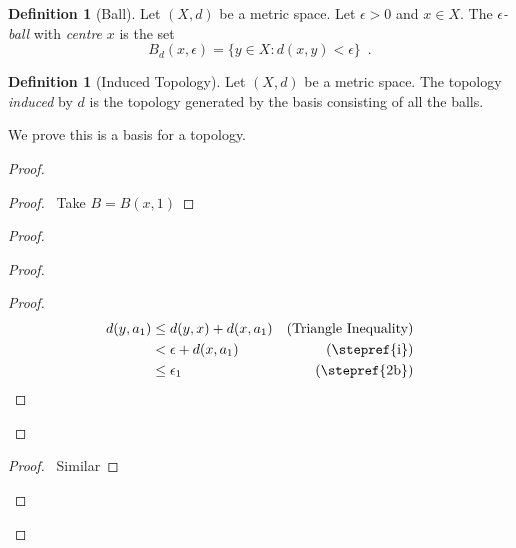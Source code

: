 \documentclass{book}
\theoremstyle{definition}
\newtheorem{df}[lm]{Definition}
\begin{document}
  \begin{df}[Ball]
    Let $(X, d)$ be a metric space. Let $\epsilon > 0$ and $x \in X$. The 
    \emph{$\epsilon$-ball} with \emph{centre} $x$ is the set
    \[ B_d(x, \epsilon) = \{ y \in X : d(x, y) < \epsilon \} \enspace . \]
  \end{df}
  
  \begin{df}[Induced Topology]
    Let $(X, d)$ be a metric space. The topology \emph{induced} by $d$ is the 
    topology generated by the basis consisting of all the balls.
    
    We prove this is a basis for a topology.
  \end{df}
  
  \begin{proof}
    \begin{proof}
      \pf\ Take $B = B(x, 1)$
    \end{proof}
    \begin{proof}
      \begin{proof}
        \begin{proof}
          \pf\ \begin{align*}
            d(y, a_1) & \leq d(y, x) + d(x, a_1) & (\text{Triangle 
              Inequality}) \\
            & < \epsilon + d(x, a_1) & (\text{\stepref{i}}) \\
            & \leq \epsilon_1 & (\text{\stepref{2b}})
          \end{align*}
        \end{proof}
      \end{proof}
      \begin{proof}
        \pf\ Similar
      \end{proof}
    \end{proof}
  \end{proof}
  
\end{document}

